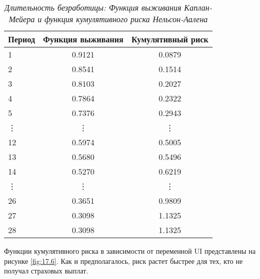     \begin{table}[!htbp]\caption{\textit{Длительность безработицы: Функция выживания Каплан-Мейера и функция кумулятивного риска Нельсон-Аалена}}\label{tab:17.7}
    \begin{center}
\begin{tabular}{lcc}
\hline \hline
\textbf{Период}&\textbf{Функция выживания}&\textbf{Кумулятивный риск}\\
\hline
1   &0.9121 &0.0879\\
2   &0.8541 &0.1514\\
3   &0.8103 &0.2027\\
4   &0.7864 &0.2322\\
5   &0.7376 &0.2943\\
\vdots&\vdots&\vdots\\
12  &0.5974 &0.5005\\
13  &0.5680 &0.5496\\
14  &0.5270 &0.6219\\
\vdots&\vdots&\vdots\\
26  &0.3651 &0.9809\\
27  &0.3098 &1.1325\\
28  &0.3098 &1.1325\\
\hline \hline
\end{tabular}
    \end{center}
    \end{table}

Функции кумулятивного риска в зависимости от переменной UI представлены на рисунке \ref{fig:17.6}. Как и предполагалось, риск растет быстрее для тех, кто не получал страховых выплат.

